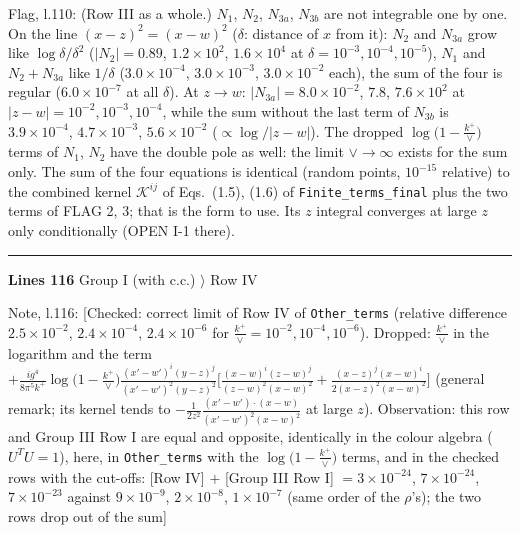 \documentclass[10pt]{article}
\newenvironment{notebox}{\def\FrameCommand{{\color{notebar}\vrule width 1.5pt}\hspace{6pt}}\MakeFramed{\advance\hsize-\width\FrameRestore}\small}{\endMakeFramed}
\begin{document}
\begin{notebox}\textsf{\small Flag, l.110:}  (Row III as a whole.) $N_{1}$, $N_{2}$, $N_{3a}$, $N_{3b}$ are not integrable one by one. On the line $(x-z)^{2}=(x-w)^{2}$ ($\delta$: distance of $x$ from it): $N_{2}$ and $N_{3a}$ grow like $\log\delta/\delta^{2}$ ($|N_{2}|=0.89$, $1.2\times10^{2}$, $1.6\times10^{4}$ at $\delta=10^{-3},10^{-4},10^{-5}$), $N_{1}$ and $N_{2}+N_{3a}$ like $1/\delta$ ($3.0\times10^{-4}$, $3.0\times10^{-3}$, $3.0\times10^{-2}$ each), the sum of the four is regular ($6.0\times10^{-7}$ at all $\delta$). At $z\to w$: $|N_{3a}|=8.0\times10^{-2}$, $7.8$, $7.6\times10^{2}$ at $|z-w|=10^{-2},10^{-3},10^{-4}$, while the sum without the last term of $N_{3b}$ is $3.9\times10^{-4}$, $4.7\times10^{-3}$, $5.6\times10^{-2}$ ($\propto\log/|z-w|$). The dropped $\log\big(1-\frac{k^{+}}{\vee}\big)$ terms of $N_{1}$, $N_{2}$ have the double pole as well: the limit $\vee\to\infty$ exists for the sum only. The sum of the four equations is identical (random points, $10^{-15}$ relative) to the combined kernel $\mathcal{K}^{ij}$ of Eqs.~(1.5), (1.6) of \texttt{Finite\_terms\_final} plus the two terms of FLAG 2, 3; that is the form to use. Its $z$ integral converges at large $z$ only conditionally (OPEN I-1 there).\end{notebox}
\noindent\rule{\linewidth}{0.3pt}\par\noindent\textbf{Lines 116} \quad \textsf{Group I (with c.c.) $\rangle$ Row IV}\par
\begin{notebox}\textsf{\small Note, l.116:} [Checked: correct limit of Row IV of \texttt{Other\_terms} (relative difference $2.5\times10^{-2}$, $2.4\times10^{-4}$, $2.4\times10^{-6}$ for $\frac{k^{+}}{\vee}=10^{-2},10^{-4},10^{-6}$). Dropped: $\frac{k^{+}}{\vee}$ in the logarithm and the term $+\frac{ig^{4}}{8\pi^{5}k^{+}}\log\big(1-\frac{k^{+}}{\vee}\big)\frac{(x'-w')^{i}(y-z)^{j}}{(x'-w')^{2}(y-z)^{2}}\big[\frac{(x-w)^{i}(z-w)^{j}}{(z-w)^{2}(x-w)^{2}}+\frac{(x-z)^{j}(x-w)^{i}}{2(x-z)^{2}(x-w)^{2}}\big]$ (general remark; its kernel tends to $-\frac{1}{2z^{2}}\frac{(x'-w')\cdot(x-w)}{(x'-w')^{2}(x-w)^{2}}$ at large $z$). Observation: this row and Group III Row I are equal and opposite, identically in the colour algebra ($U^{T}U=1$), here, in \texttt{Other\_terms} with the $\log\big(1-\frac{k^{+}}{\vee}\big)$ terms, and in the checked rows with the cut-offs: [Row IV] $+$ [Group III Row I] $=3\times10^{-24}$, $7\times10^{-24}$, $7\times10^{-23}$ against $9\times10^{-9}$, $2\times10^{-8}$, $1\times10^{-7}$ (same order of the $\rho$'s); the two rows drop out of the sum]\end{notebox}
\end{document}
